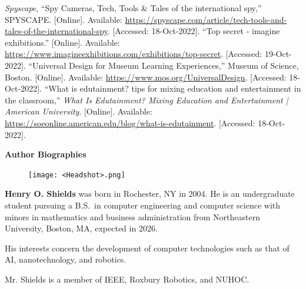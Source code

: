 \documentclass[conference]{IEEEtran}
\begin{document}
\begin{thebibliography}{00}
 \textit{Spyscape}, “Spy Cameras, Tech, Tools & Tales of the international spy,” SPYSCAPE. [Online]. Available: \href{https://spyscape.com/article/tech-tools-and-tales-of-the-international-spy}{https://spyscape.com/article/tech-tools-and-tales-of-the-international-spy}. [Accessed: 18-Oct-2022].
 “Top secret - imagine exhibitions.” [Online]. Available: \href{https://www.imagineexhibitions.com/exhibitions/top-secret}{https://www.imagineexhibitions.com/exhibitions/top-secret}. [Accessed: 19-Oct-2022].
 “Universal Design for Museum Learning Experiences,” Museum of Science, Boston.  [Online]. Available: \href{https://www.mos.org/UniversalDesign}{https://www.mos.org/UniversalDesign}. [Accessed: 18-Oct-2022].
 “What is edutainment? tips for mixing education and entertainment in the classroom,” \textit{What Is Edutainment? Mixing Education and Entertainment | American University}. [Online]. Available: \href{https://soeonline.american.edu/blog/what-is-edutainment}{https://soeonline.american.edu/blog/what-is-edutainment}. [Accessed: 18-Oct-2022]. 
\end{thebibliography}

\twocolumn


  \LARGE \textbf{Author Biographies}  

  \vspace{15pt} \normalsize


  \begin{figure}
    \texttt{[image: <Headshot>.png]}
  \end{figure}
  \par \textbf{Henry O. Shields} was born in Rochester, NY in 2004. He is an undergraduate student pursuing a B.S.\ in computer engineering and computer science with minors in mathematics and business administration from Northeastern University, Boston, MA, expected in 2026.
\par His interests concern the development of computer technologies such as that of AI, nanotechnology, and robotics.
\par Mr. Shields is a member of IEEE, Roxbury Robotics, and NUHOC.
\end{document}
